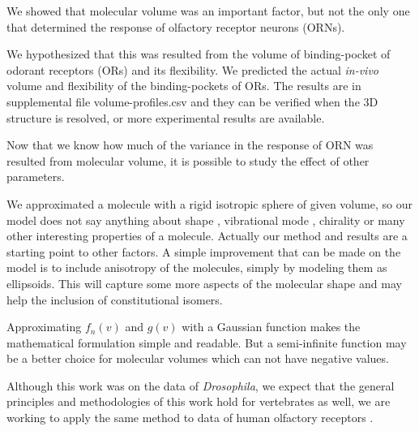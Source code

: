 \documentclass[11pt]{paper} %
\begin{document}
We showed that molecular volume was an important factor, 
but not the only one that determined the response of olfactory receptor neurons (ORNs). 

We hypothesized that this was resulted from the volume of binding-pocket of odorant receptors (ORs) and its flexibility. 
We predicted the actual \textit{in-vivo} volume and flexibility of the binding-pockets of ORs. 
The results are in supplemental file volume-profiles.csv and they can be verified when the 3D structure is resolved, 
or more experimental results are available. 

Now that we know how much of the variance in the response of ORN was resulted from molecular volume, 
it is possible to study the effect of other parameters.

We approximated a molecule with a rigid isotropic sphere of given volume, 
so our model does not say anything about shape \cite{Keller2004, Araneda2000, uchida2000}, 
vibrational mode \cite{Turin,Franco2011,turin2015plausibility}, 
chirality \cite{tirandaz2015dissipative} or many other interesting properties of a molecule.
Actually our method and results are a starting point to other factors. 
A simple improvement that can be made on the model is to include anisotropy of the molecules, 
simply by modeling  them as ellipsoids. 
This will capture some more aspects of the molecular shape and may help the inclusion of constitutional isomers. 

Approximating $f_n(v)$ and $g(v)$ with a Gaussian function makes the mathematical formulation simple and readable. 
But a semi-infinite function may be a better choice for molecular volumes which can not have negative values.

Although this work was on the data of \textit{Drosophila}, 
we expect that the general principles and methodologies of this work hold for vertebrates as well, 
we are working to apply the same method to data of human olfactory receptors \cite{mainland2015human}.

\end{document}
